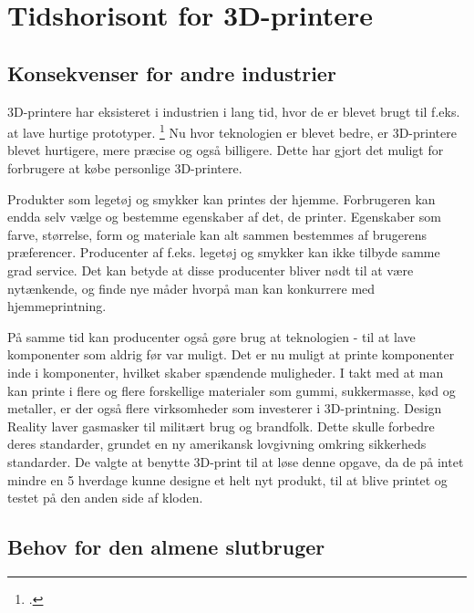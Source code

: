 
\chapter{Tidshorisont for 3D-printere}
\section{Konsekvenser for andre industrier}


3D-printere har eksisteret i industrien i lang tid, hvor de er blevet brugt til f.eks. at lave hurtige prototyper. \footcite[105]{manyika_disruptive_2013} Nu hvor teknologien er blevet bedre, er 3D-printere blevet hurtigere, mere præcise og også billigere. Dette har gjort det muligt for forbrugere at købe personlige 3D-printere. 


Produkter som legetøj og smykker kan printes der hjemme. Forbrugeren kan endda selv vælge og bestemme egenskaber af det, de printer. Egenskaber som farve, størrelse, form og materiale kan alt sammen bestemmes af brugerens præferencer. Producenter af f.eks. legetøj og smykker kan ikke tilbyde samme grad service. Det kan betyde at disse producenter bliver nødt til at være nytænkende, og finde nye måder hvorpå man kan konkurrere med hjemmeprintning.

På samme tid kan producenter også gøre brug at teknologien -{} til at lave komponenter som aldrig før var muligt. Det er nu muligt at printe komponenter inde i komponenter, hvilket skaber spændende muligheder.
I takt med at man kan printe i flere og flere forskellige materialer som gummi, sukkermasse, kød og metaller, er der også flere virksomheder som investerer i 3D-printning.
Design Reality laver gasmasker til militært brug og brandfolk. Dette skulle forbedre deres standarder, grundet en ny amerikansk lovgivning omkring sikkerheds standarder. De valgte at benytte 3D-print til at løse denne opgave, da de på intet mindre en 5 hverdage kunne designe et helt nyt produkt, til at blive printet og testet på den anden side af kloden. \autocite{3ders.org_design_2013}



\section{Behov for den almene slutbruger}

